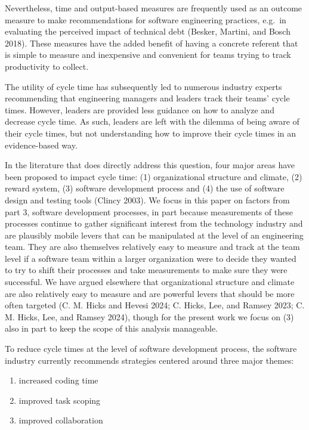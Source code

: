 \documentclass[
]{article}
\providecommand{\tightlist}{%
  \setlength{\itemsep}{0pt}\setlength{\parskip}{0pt}}\usepackage{longtable,booktabs,array}
\begin{document}
Nevertheless, time and output-based measures are frequently used as an
outcome measure to make recommendations for software engineering
practices, e.g.~in evaluating the perceived impact of technical debt
(Besker, Martini, and Bosch 2018). These measures have the added benefit
of having a concrete referent that is simple to measure and inexpensive
and convenient for teams trying to track productivity to collect.

The utility of cycle time has subsequently led to numerous industry
experts recommending that engineering managers and leaders track their
teams' cycle times. However, leaders are provided less guidance on how
to analyze and decrease cycle time. As such, leaders are left with the
dilemma of being aware of their cycle times, but not understanding how
to improve their cycle times in an evidence-based way.

In the literature that does directly address this question, four major
areas have been proposed to impact cycle time: (1) organizational
structure and climate, (2) reward system, (3) software development
process and (4) the use of software design and testing tools (Clincy
2003). We focus in this paper on factors from part 3, software
development processes, in part because measurements of these processes
continue to gather significant interest from the technology industry and
are plausibly mobile levers that can be manipulated at the level of an
engineering team. They are also themselves relatively easy to measure
and track at the team level if a software team within a larger
organization were to decide they wanted to try to shift their processes
and take measurements to make sure they were successful. We have argued
elsewhere that organizational structure and climate are also relatively
easy to measure and are powerful levers that should be more often
targeted (C. M. Hicks and Hevesi 2024; C. Hicks, Lee, and Ramsey 2023;
C. M. Hicks, Lee, and Ramsey 2024), though for the present work we focus
on (3) also in part to keep the scope of this analysis manageable.

To reduce cycle times at the level of software development process, the
software industry currently recommends strategies centered around three
major themes:

\begin{enumerate}
\def\labelenumi{\arabic{enumi}.}
\tightlist
\item
  increased coding time
\item
  improved task scoping
\item
  improved collaboration
\end{enumerate}
\end{document}
